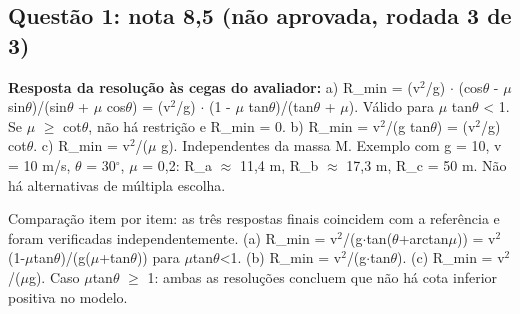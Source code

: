 \documentclass{article}%
\begin{document}
\subsection*{Questão 1: nota 8,5 (não aprovada, rodada 3 de 3)}%
\textbf{Resposta da resolução às cegas do avaliador:} a) R\_min = (v$^2$/g) $\cdot$ (cos$\theta$ - $\mu$ sin$\theta$)/(sin$\theta$ + $\mu$ cos$\theta$) = (v$^2$/g) $\cdot$ (1 - $\mu$ tan$\theta$)/(tan$\theta$ + $\mu$). Válido para $\mu$ tan$\theta$ < 1. Se $\mu$ $\geq$ cot$\theta$, não há restrição e R\_min = 0.\newline%
\newline%
b) R\_min = v$^2$/(g tan$\theta$) = (v$^2$/g) cot$\theta$.\newline%
\newline%
c) R\_min = v$^2$/($\mu$ g).\newline%
\newline%
Independentes da massa M. Exemplo com g = 10, v = 10 m/s, $\theta$ = 30$^\circ$, $\mu$ = 0,2: R\_a $\approx$ 11,4 m, R\_b $\approx$ 17,3 m, R\_c = 50 m.\newline%
\newline%
Não há alternativas de múltipla escolha.\par %
Comparação item por item: as três respostas finais coincidem com a referência e foram verificadas independentemente. (a) R\_min = v$^2$/(g$\cdot$tan($\theta$+arctan$\mu$)) = v$^2$(1-$\mu$tan$\theta$)/(g($\mu$+tan$\theta$)) para $\mu$tan$\theta$<1. (b) R\_min = v$^2$/(g$\cdot$tan$\theta$). (c) R\_min = v$^2$/($\mu$g). Caso $\mu$tan$\theta$ $\geq$ 1: ambas as resoluções concluem que não há cota inferior positiva no modelo.\newline%
\newline%
\end{document}
